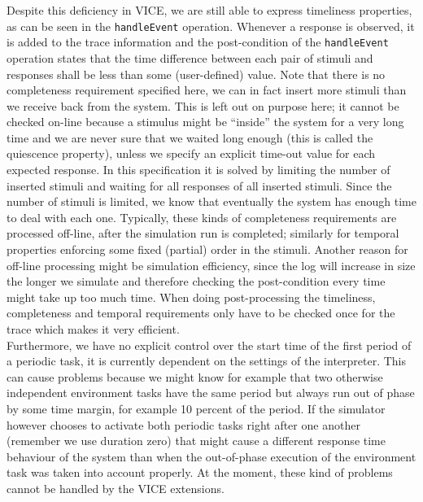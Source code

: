 Despite this deficiency in VICE, we are still able to express timeliness
properties, as can be seen in the \verb+handleEvent+ operation. Whenever
a response is observed, it is added to the trace information and the
post-condition of the \verb+handleEvent+ operation states that the time
difference between each pair of stimuli and responses shall be less than
some (user-defined) value. Note that there is no completeness requirement
specified here, we can in fact insert more stimuli than we receive back
from the system. This is left out on purpose here; it cannot be checked
on-line because a stimulus might be ``inside'' the system for a very long
time and we are never sure that we waited long enough (this is called the
quiescence property), unless we specify an explicit time-out value for each
expected response. In this specification it is solved by limiting the number
of inserted stimuli and waiting for all responses of all inserted stimuli.
Since the number of stimuli is limited, we know that eventually the system
has enough time to deal with each one. Typically, these kinds of completeness
requirements are processed off-line, after the simulation run is completed;
similarly for temporal properties enforcing some fixed (partial) order in
the stimuli. Another reason for off-line processing might be simulation
efficiency, since the log will increase in size the longer we simulate and
therefore checking the post-condition every time might take up too much
time. When doing post-processing the timeliness, completeness and temporal
requirements only have to be checked once for the trace which makes it
very efficient. \\

Furthermore, we have no explicit control over the start time of the first
period of a periodic task, it is currently dependent on the settings of the
interpreter. This can cause problems because we might know for example that
two otherwise independent environment tasks have the same period but always
run out of phase by some time margin, for example 10 percent of the period.
If the simulator however chooses to activate both periodic tasks right after
one another (remember we use duration zero) that might cause a different
response time behaviour of the system than when the out-of-phase execution
of the environment task was taken into account properly. At the moment,
these kind of problems cannot be handled by the VICE extensions. \\

